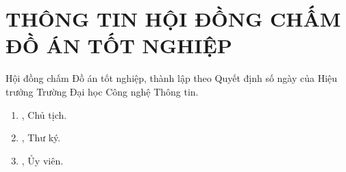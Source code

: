 \chapter*{THÔNG TIN HỘI ĐỒNG CHẤM ĐỒ ÁN TỐT NGHIỆP}
\thispagestyle{empty}

Hội đồng chấm Đồ án tốt nghiệp, thành lập theo Quyết định số \underline{\hspace{3cm}}
ngày \underline{\hspace{2.5cm}} của Hiệu trưởng Trường Đại học Công nghệ Thông tin.

\vspace{1cm}
\begin{enumerate}
  \item \underline{\hspace{7cm}}, Chủ tịch.
  \item \underline{\hspace{7cm}}, Thư ký.
  \item \underline{\hspace{7cm}}, Ủy viên.
\end{enumerate}
